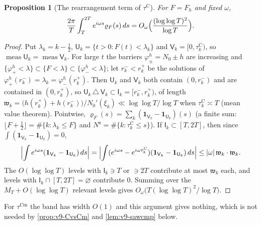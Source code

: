 \documentclass[11pt,a4paper]{article}
\numberwithin{equation}{section}
\newtheorem{proposition}[theorem]{Proposition}
\theoremstyle{definition}
\theoremstyle{remark}
\newcommand{\meas}{\operatorname{meas}}
\newcommand{\ind}{\mathbf 1}
\newcommand{\Cm}{\mathrm{Cm}}
\begin{document}
\begin{proposition}[The rearrangement term of $\tau^{\mathrm C}$]\label{prop:v9-rearr}
For $F=F_h$ and fixed $\omega$,
\begin{equation}\label{eq:v9-rearr}
\frac{2\pi}{T}\int_T^{2T}e^{i\omega s}\varrho_F(s)\,ds=O_\omega\Bigl(\frac{(\log\log T)^2}{\log T}\Bigr).
\end{equation}
\end{proposition}
\begin{proof}
Put $\lambda_k=k-\frac12$, $\mathsf U_k=\{t>0:F(t)<\lambda_k\}$ and $\mathsf V_k=[0,\tau_k^{\mathrm C})$, so $\meas\mathsf U_k=\meas\mathsf V_k$. For large $t$ the barriers $\varphi^h_\pm=N_0\pm h$ are increasing and $\{\varphi^h_+<\lambda\}\subset\{F<\lambda\}\subset\{\varphi^h_-<\lambda\}$; let $r_k^-<r_k^+$ be the solutions of $\varphi^h_+(r_k^-)=\lambda_k=\varphi^h_-(r_k^+)$. Then $\mathsf U_k$ and $\mathsf V_k$ both contain $(0,r_k^-)$ and are contained in $(0,r_k^+)$, so $\mathsf U_k\,\triangle\,\mathsf V_k\subset\mathsf I_k=[r_k^-,r_k^+)$, of length $\mathfrak w_k=\bigl(h(r_k^+)+h(r_k^-)\bigr)/N_0'(\xi_k)\ll\log\log T/\log T$ when $\tau_k^{\mathrm C}\asymp T$ (mean value theorem). Pointwise, $\varrho_F(s)=\sum_k(\ind_{\mathsf V_k}-\ind_{\mathsf U_k})(s)$ (a finite sum: $\lfloor F+\frac12\rfloor=\#\{k:\lambda_k\le F\}$ and $N^{\mathsf x}=\#\{k:\tau_k^{\mathrm C}\le s\}$). If $\mathsf I_k\subset[T,2T]$, then since $\int(\ind_{\mathsf V_k}-\ind_{\mathsf U_k})=0$,
\begin{equation}
\Bigl|\int e^{i\omega s}(\ind_{\mathsf V_k}-\ind_{\mathsf U_k})\,ds\Bigr|
=\Bigl|\int(e^{i\omega s}-e^{i\omega\tau_k^{\mathrm C}})(\ind_{\mathsf V_k}-\ind_{\mathsf U_k})\,ds\Bigr|\le|\omega|\,\mathfrak w_k\cdot\mathfrak w_k .
\end{equation}
The $O(\log\log T)$ levels with $\mathsf I_k\ni T$ or $\ni2T$ contribute at most $\mathfrak w_k$ each, and levels with $\mathsf I_k\cap[T,2T]=\varnothing$ contribute $0$. Summing over the $M_T+O(\log\log T)$ relevant levels gives $O_\omega\bigl(T(\log\log T)^2/\log T\bigr)$.
\end{proof}
For $\tau^{\Cm}$ the band has width $O(1)$ and this argument gives nothing, which is not needed by \cref{prop:v9-CvsCm} and \cref{lem:v9-sawcmp} below.
\end{document}
